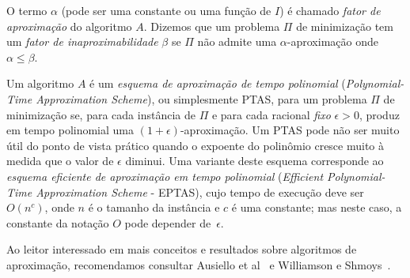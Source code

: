 O termo $\alpha$ (pode ser uma constante ou uma função de $I$) é
chamado \emph{fator de aproximação} do algoritmo $A$. 
Dizemos que um problema $\Pi$ de minimização tem um  \emph{fator de
  inaproximabilidade} $\beta$ se $\Pi$ não admite uma
$\alpha$-aproximação onde $\alpha\leq \beta$. 


Um algoritmo $A$ é um \emph{esquema de aproximação de tempo
  polinomial} (\emph{Polynomial-Time Approximation Scheme}), ou
simplesmente PTAS, para um problema  $\Pi$ de minimização se, para
cada instância de $\Pi$ e para cada racional \emph{fixo} $\epsilon >
0$, produz em tempo polinomial uma $(1 + \epsilon)$-aproximação.  Um
PTAS pode não ser muito útil do ponto de vista prático quando o
expoente do polinômio cresce muito à medida que o valor de $\epsilon$ diminui.  Uma variante deste esquema corresponde ao \emph{esquema
  eficiente de aproximação em tempo polinomial} (\emph{Efficient
  Polynomial-Time Approximation Scheme} - EPTAS), cujo tempo de
execução deve ser  $O(n^c)$, onde $n$ é  o tamanho da instância e $c$ é uma
constante; mas neste caso, a constante da notação $O$ pode depender de~$\epsilon$.

Ao leitor interessado em mais conceitos e resultados sobre algoritmos de aproximação, recomendamos consultar Ausiello et al~\cite{AusielloPMGCK1999} e Williamson e Shmoys~\cite{WilliamsonS2011}. 


